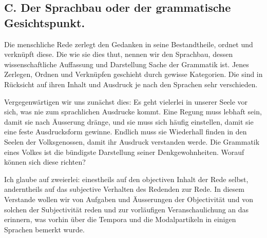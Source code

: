 \label{fp.417}

\subsection*{C. Der Sprachbau oder der grammatische Gesichtspunkt.}\label{IV.IV.18C}

Die menschliche Rede zerlegt den Gedanken in seine Bestandtheile, ordnet und verknüpft diese. Die  wie sie dies thut, nennen wir den Sprachbau, dessen wissenschaftliche Auffassung und Darstellung Sache der Grammatik ist. Jenes Zerlegen, Ordnen und Verknüpfen geschieht durch gewisse Kategorien. Die sind in Rücksicht auf ihren Inhalt und Ausdruck je nach den Sprachen sehr verschieden.

Vergegenwärtigen wir uns zunächst dies: Es geht vielerlei in unserer Seele vor sich, was nie zum sprachlichen Ausdrucke kommt. Eine Regung muss lebhaft sein, damit sie nach Äusserung dränge, und sie muss sich häufig einstellen, damit sie eine feste Ausdrucksform gewinne. Endlich muss sie Wiederhall \label{sp.438} finden in den Seelen der Volksgenossen, damit ihr Ausdruck verstanden werde. Die Grammatik eines Volkes ist die bündigste Darstellung seiner Denkgewohnheiten. Worauf können sich diese richten?

Ich glaube auf zweierlei: einestheils auf den objectiven Inhalt der Rede selbst, anderntheils auf das subjective Verhalten des Redenden zur Rede. In diesem Verstande wollen wir von Aufgaben und Äusserungen der Objectivität und von solchen der Subjectivität reden und zur vorläufigen Veranschaulichung an das erinnern, was vorhin über die Tempora und die Modalpartikeln in einigen Sprachen bemerkt wurde.

